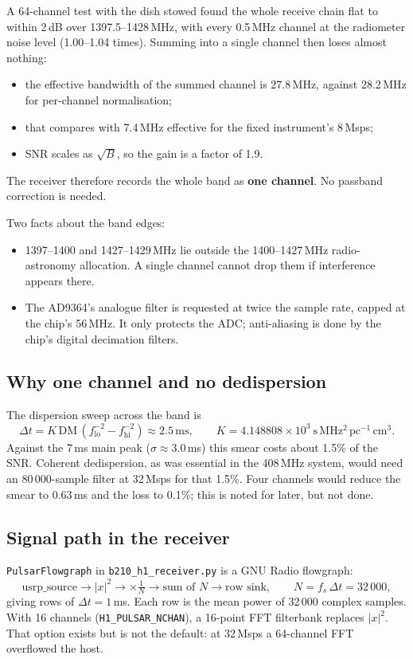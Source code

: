 \documentclass[11pt,a4paper]{article}
\newcommand{\code}[1]{\texttt{#1}}
\begin{document}
A 64-channel test with the dish stowed found the whole receive chain flat to within 2\,dB over 1397.5--1428\,MHz, with every 0.5\,MHz channel at the radiometer noise level (1.00--1.04 times). Summing into a single channel then loses almost nothing:
\begin{itemize}
\item the effective bandwidth of the summed channel is 27.8\,MHz, against 28.2\,MHz for per-channel normalisation;
\item that compares with 7.4\,MHz effective for the fixed instrument's 8\,Msps;
\item SNR scales as $\sqrt{B}$, so the gain is a factor of 1.9.
\end{itemize}
The receiver therefore records the whole band as \textbf{one channel}. No passband correction is needed.

Two facts about the band edges:
\begin{itemize}
\item 1397--1400 and 1427--1429\,MHz lie outside the 1400--1427\,MHz radio-astronomy allocation. A single channel cannot drop them if interference appears there.
\item The AD9364's analogue filter is requested at twice the sample rate, capped at the chip's 56\,MHz. It only protects the ADC; anti-aliasing is done by the chip's digital decimation filters.
\end{itemize}

\subsection{Why one channel and no dedispersion}
The dispersion sweep across the band is
\begin{equation}
\Delta t = K\,\mathrm{DM}\,\left(f_\mathrm{lo}^{-2} - f_\mathrm{hi}^{-2}\right) \approx 2.5\,\mathrm{ms},
\qquad K = 4.148808\times10^{3}\ \mathrm{s\,MHz^2\,pc^{-1}\,cm^{3}}.
\end{equation}
Against the 7\,ms main peak ($\sigma \approx 3.0$\,ms) this smear costs about 1.5\% of the SNR. Coherent dedispersion, as was essential in the 408\,MHz system, would need an 80\,000-sample filter at 32\,Msps for that 1.5\%. Four channels would reduce the smear to 0.63\,ms and the loss to 0.1\%; this is noted for later, but not done.

\subsection{Signal path in the receiver}
\code{PulsarFlowgraph} in \code{b210\_h1\_receiver.py} is a GNU Radio flowgraph:
\[
\text{usrp\_source} \rightarrow |x|^2 \rightarrow \times\tfrac{1}{N} \rightarrow \text{sum of } N \rightarrow \text{row sink},
\qquad N = f_s\,\Delta t = 32\,000,
\]
giving rows of $\Delta t = 1$\,ms. Each row is the mean power of 32\,000 complex samples. With 16 channels (\code{H1\_PULSAR\_NCHAN}), a 16-point FFT filterbank replaces $|x|^2$. That option exists but is not the default: at 32\,Msps a 64-channel FFT overflowed the host.
\end{document}
